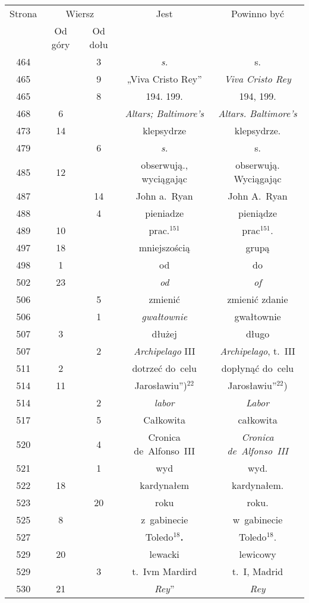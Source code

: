 \documentclass[a4paper,11pt]{article}
\begin{document}
\begin{center}
  \newpage

  \begin{tabular}{|c|c|c|c|c|}
    \hline
    Strona & \multicolumn{2}{c|}{Wiersz} & Jest
                              & Powinno być \\ \cline{2-3}
    & Od góry & Od dołu & & \\
    \hline
    464 & &  3 & \textit{s.} & s. \\
    465 & &  9 & „Viva Cristo Rey” & \textit{Viva Cristo Rey} \\
    465 & &  8 & 194. 199. & 194, 199. \\
    468 &  6 & & \textit{Altars; Baltimore's}
           & \textit{Altars. Baltimore's} \\
    473 & 14 & & klepsydrze & klepsydrze. \\
    479 & &  6 & \textit{s.} & s. \\
    485 & 12 & & obserwują., wyciągając & obserwują. Wyciągając \\
    487 & & 14 & John a.~Ryan & John A.~Ryan \\
    488 & &  4 & pieniadze & pieniądze \\
    489 & 10 & & prac.$^{151}$ & prac$^{151}$. \\
    497 & 18 & & mniejszością & grupą \\
    498 &  1 & & od & do \\
    502 & 23 & & \textit{od} & \textit{of} \\
    506 & &  5 & zmienić & zmienić zdanie \\
    506 & &  1 & \textit{gwałtownie} & gwałtownie \\
    507 &  3 & & dłużej & długo \\
    507 & &  2 & \textit{Archipelago} III & \textit{Archipelago}, t.~III \\
    511 &  2 & & dotrzeć do~celu & dopłynąć do~celu \\
    514 & 11 & & Jarosławiu”)$^{ 22 }$ & Jarosławiu”$^{ 22 }$) \\
    514 & &  2 & \textit{labor} & \textit{Labor} \\
    517 & &  5 & Całkowita & całkowita \\
    520 & &  4 & Cronica de~Alfonso~III & \textit{Cronica de~Alfonso~III} \\
    521 & &  1 & wyd & wyd. \\
    522 & 18 & & kardynałem & kardynałem. \\
    523 & & 20 & roku & roku. \\
    525 &  8 & & z~gabinecie & w~gabinecie \\
    527 & & & Toledo$^{ 18 }$\textbf{.} & Toledo$^{ 18 }$. \\
    529 & 20 & & lewacki & lewicowy \\
    529 & &  3 & t.~Ivm Mardird & t.~I, Madrid \\
    530 & 21 & & \textit{Rey}” & \textit{Rey} \\
    \hline
  \end{tabular}






\end{center}
\end{document}
